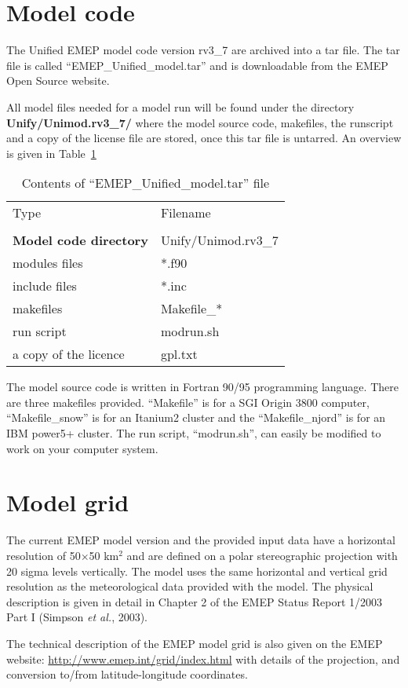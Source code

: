 \section{Model code}
\label{sec:ModelCode}

The Unified EMEP model code version rv3\_7 are archived into a tar file. 
The tar file is called ``EMEP\_Unified\_model.tar'' and is downloadable from
the EMEP Open Source website.

All model files needed for a model run will be found under the
directory {\bf Unify/Unimod.rv3\_7/} where the model source code, 
makefiles, the runscript and a copy of the license file are stored, 
once this tar file is untarred. An overview is given in 
Table~\ref{Tab:modelfiles}

\begin{table}[h]
\begin{center}
\caption{Contents of ``EMEP\_Unified\_model.tar'' file
   \label{Tab:modelfiles}}
\begin{tabular}{ll}
& \\
\hline
Type      & Filename          \\
\hline
& \\
{\bf Model code directory} & Unify/Unimod.rv3\_7 \\ 
\hline
modules files & *.f90 \\
include files & *.inc \\
makefiles & Makefile\_* \\
run script & modrun.sh \\
a copy of the licence & gpl.txt \\
\hline
\end{tabular}
\end{center}
\end{table}

The model source code is written in Fortran 90/95 programming language.
There are three makefiles provided. ``Makefile'' is for a SGI Origin 3800
computer, ``Makefile\_snow'' is for an Itanium2 cluster and the
``Makefile\_njord'' is for an IBM power5+ cluster. The run script, 
``modrun.sh'', can easily be modified to work on your computer system.


\section{Model grid}
\label{sec:ModelGrid}

The current EMEP model version and the provided input data
have a horizontal resolution of 50$\times$50 km$^2$ and are defined on a
polar stereographic projection with 20 sigma levels vertically. 
The model uses the same horizontal and vertical grid resolution as the 
meteorological data provided with the model. The physical
description is given in detail in Chapter 2 of the EMEP Status Report
1/2003 Part I (Simpson {\sl et al.}, 2003).

The technical description of the EMEP model grid is also given on the 
EMEP website:
\url{http://www.emep.int/grid/index.html} with details of the projection, and
conversion to/from latitude-longitude coordinates.
